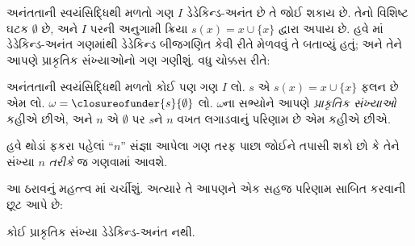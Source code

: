 અનંતતાની સ્વયંસિદ્ધિથી મળતો ગણ $I$ ડેડેકિન્ડ-અનંત છે તે જોઈ શકાય
છે. તેનો વિશિષ્ટ ઘટક $\emptyset$ છે, અને $I$ પરની અનુગામી ક્રિયા
$s(x) = x\cup
\{x\}$ દ્વારા અપાય છે. હવે
માં
ડેડેકિન્ડ-અનંત ગણમાંથી ડેડેકિન્ડ બીજગણિત કેવી રીતે મેળવવું તે
બતાવ્યું હતું; અને તેને આપણે પ્રાકૃતિક સંખ્યાઓનો ગણ ગણીશું.
વધુ ચોક્કસ રીતે:
\begin{defn}
અનંતતાની સ્વયંસિદ્ધિથી મળતો કોઈ પણ ગણ $I$ લો. $s$ એ
$s(x) = x \cup \{x\}$ ફલન છે એમ લો. $\omega =
\closureofunder{s}{\emptyset}$ લો. $\omega$ના સભ્યોને આપણે
\emph{પ્રાકૃતિક સંખ્યાઓ} કહીએ છીએ, અને $n$ એ $\emptyset$ પર
$s$ને $n$ વખત લગાડવાનું પરિણામ છે એમ કહીએ છીએ.
\end{defn}

હવે થોડાં ફકરા પહેલાં “$n$” સંજ્ઞા આપેલા ગણ તરફ પાછા જોઈને
તપાસી શકો છો કે તેને સંખ્યા $n$ \emph{તરીકે} જ ગણવામાં આવશે.

આ ઠરાવનું મહત્ત્વ માં ચર્ચીશું.
અત્યારે તે આપણને એક સહજ પરિણામ સાબિત કરવાની છૂટ આપે છે:

\begin{prop}
કોઈ પ્રાકૃતિક સંખ્યા ડેડેકિન્ડ-અનંત નથી.
\end{prop}

